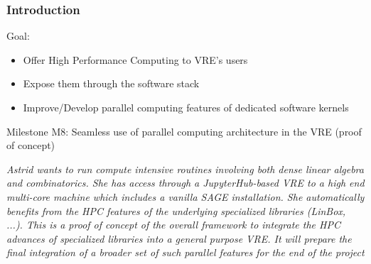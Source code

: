 \documentclass{beamer}
\begin{document}
\begin{frame}
  \frametitle{Introduction}
  \begin{block}
    {Goal:}
    \begin{itemize}
    \item Offer High Performance Computing to VRE's users
    \item Expose them through the software stack
    \item Improve/Develop parallel computing features of dedicated software
      kernels
    \end{itemize}
  \end{block}

  \begin{block}
      {Milestone M8: Seamless use of parallel computing architecture in the VRE (proof of concept)}

{\footnotesize  \textit{Astrid wants to run compute intensive routines involving both dense linear algebra and combinatorics. She has access through a JupyterHub-based VRE to a high end multi-core machine which includes a vanilla SAGE installation.
She automatically benefits from the HPC features of the underlying specialized
libraries (LinBox, ...). This is a proof of concept of the overall framework to
integrate the HPC advances of specialized libraries into a general purpose
VRE. It will prepare the final integration of a broader set of such parallel
features for the end of the project}
  }

  \end{block}
\end{frame}

\end{document}
